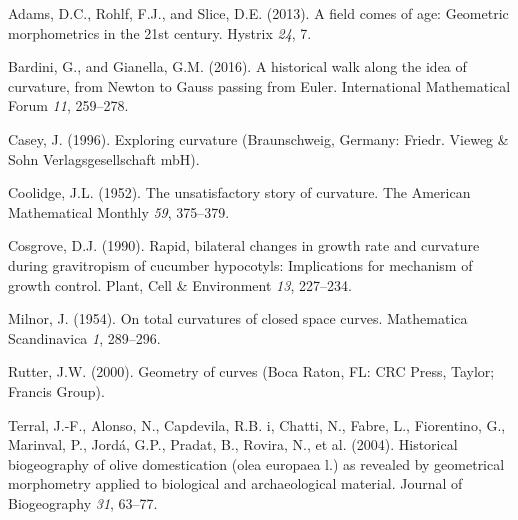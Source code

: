\documentclass[]{article}
\begin{document}
\hypertarget{refs}{}
\leavevmode\hypertarget{ref-adams_2013}{}%
Adams, D.C., Rohlf, F.J., and Slice, D.E. (2013). A field comes of age:
Geometric morphometrics in the 21st century. Hystrix \emph{24}, 7.

\leavevmode\hypertarget{ref-bardini_2016}{}%
Bardini, G., and Gianella, G.M. (2016). A historical walk along the idea
of curvature, from Newton to Gauss passing from Euler. International
Mathematical Forum \emph{11}, 259--278.

\leavevmode\hypertarget{ref-casey_1996}{}%
Casey, J. (1996). Exploring curvature (Braunschweig, Germany: Friedr.
Vieweg \& Sohn Verlagsgesellschaft mbH).

\leavevmode\hypertarget{ref-coolidge_1952}{}%
Coolidge, J.L. (1952). The unsatisfactory story of curvature. The
American Mathematical Monthly \emph{59}, 375--379.

\leavevmode\hypertarget{ref-cosgrove_1990}{}%
Cosgrove, D.J. (1990). Rapid, bilateral changes in growth rate and
curvature during gravitropism of cucumber hypocotyls: Implications for
mechanism of growth control. Plant, Cell \& Environment \emph{13},
227--234.

\leavevmode\hypertarget{ref-milnor_1954}{}%
Milnor, J. (1954). On total curvatures of closed space curves.
Mathematica Scandinavica \emph{1}, 289--296.

\leavevmode\hypertarget{ref-rutter_2000}{}%
Rutter, J.W. (2000). Geometry of curves (Boca Raton, FL: CRC Press,
Taylor; Francis Group).

\leavevmode\hypertarget{ref-terral_2004}{}%
Terral, J.-F., Alonso, N., Capdevila, R.B. i, Chatti, N., Fabre, L.,
Fiorentino, G., Marinval, P., Jordá, G.P., Pradat, B., Rovira, N., et
al. (2004). Historical biogeography of olive domestication (olea
europaea l.) as revealed by geometrical morphometry applied to
biological and archaeological material. Journal of Biogeography
\emph{31}, 63--77.
\end{document}
